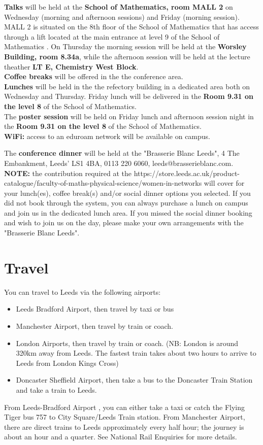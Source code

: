 \textbf{Talks} will be held at the \textbf{School of Mathematics, room MALL 2} on  Wednesday (morning and afternoon sessions) and Friday (morning session). MALL 2 is situated on the 8th floor of the School of Mathematics that has access through a lift located at the main entrance at level 9 of the School of Mathematics . 
On Thursday the morning session will be held at the \textbf{Worsley Building, room 8.34a}, while the afternoon session will be held at the lecture theather \textbf{ LT E, Chemistry West Block}.\\
\textbf{Coffee breaks} will be offered in the the conference area.\\
\textbf{Lunches} will be held in the the refectory building in a dedicated area both on Wednesday and Thursday. Friday lunch will be delivered  in the \textbf{Room 9.31 on the level 8} of the School of Mathematics.\\

The \textbf{poster session} will be held on Friday lunch and afternoon session night in the \textbf{Room 9.31 on the level 8} of the School of Mathematics. \\

\textbf{WiFi:} access to an eduroam network will be available on campus.

The \textbf{conference dinner} will be held at the "Brasserie Blanc Leeds",
4 The Embankment,
Leeds'
LS1 4BA,
0113 220 6060,
leeds@brasserieblanc.com.\\

\textbf{NOTE:} the contribution required at the https://store.leeds.ac.uk/product-catalogue/faculty-of-maths-physical-science/women-in-networks will cover for your lunch(es), coffee break(s) and/or social dinner options you selected. If you did not book through the system, you can always purchase a lunch on campus and join us in the dedicated lunch area. If you missed the social dinner booking and wish to join us on the day, please make your own arrangements with the "Brasserie Blanc Leeds".  

\section{Travel}
You can travel to Leeds via the following airports:
\begin{itemize}
\item Leeds Bradford Airport, then travel by taxi or bus
\item Manchester Airport, then travel by train or coach.
\item London Airports, then travel by train or coach. (NB: London is around 320km away from Leeds. The fastest train takes about two hours to arrive to Leeds from London Kings Cross)
\item Doncaster Sheffield Airport, then take a bus to the Doncaster Train Station and take a train to Leeds.
\end{itemize}
From Leeds-Bradford Airport , you can either take a taxi or catch the Flying Tiger bus 757 to City Square/Leeds Train station. From Manchester Airport, there are direct trains to Leeds approximately every half hour; the journey is about an hour and a quarter. See National Rail Enquiries for more details.

